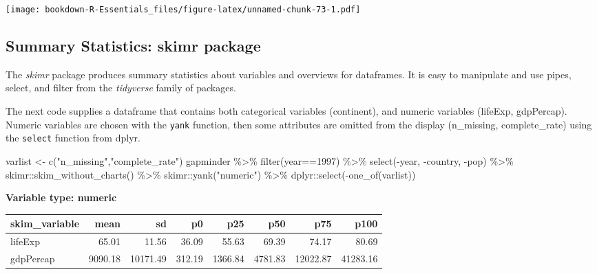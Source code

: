 \documentclass[
]{book}
\newenvironment{Shaded}{\begin{snugshade}}{\end{snugshade}}
\newcommand{\DecValTok}[1]{\textcolor[rgb]{0.00,0.00,0.81}{#1}}
\newcommand{\FunctionTok}[1]{\textcolor[rgb]{0.00,0.00,0.00}{#1}}
\newcommand{\NormalTok}[1]{#1}
\newcommand{\OtherTok}[1]{\textcolor[rgb]{0.56,0.35,0.01}{#1}}
\newcommand{\SpecialCharTok}[1]{\textcolor[rgb]{0.00,0.00,0.00}{#1}}
\newcommand{\StringTok}[1]{\textcolor[rgb]{0.31,0.60,0.02}{#1}}
\begin{document}
\texttt{[image: bookdown-R-Essentials\_files/figure-latex/unnamed-chunk-73-1.pdf]}

\hypertarget{summary-statistics-skimr-package}{%
\subsection{Summary Statistics: skimr package}\label{summary-statistics-skimr-package}}

The \emph{skimr} package produces summary statistics about variables and overviews for dataframes. It is easy to manipulate and use pipes, select, and filter from the \emph{tidyverse} family of packages.

The next code supplies a dataframe that contains both categorical variables (continent), and numeric variables (lifeExp, gdpPercap). Numeric variables are chosen with the \texttt{yank} function, then some attributes are omitted from the display (n\_missing, complete\_rate) using the \texttt{select} function from dplyr.

\begin{Shaded}
\begin{Highlighting}[]
\NormalTok{varlist }\OtherTok{\textless{}{-}} \FunctionTok{c}\NormalTok{(}\StringTok{"n\_missing"}\NormalTok{,}\StringTok{"complete\_rate"}\NormalTok{)}
\NormalTok{gapminder }\SpecialCharTok{\%\textgreater{}\%} 
  \FunctionTok{filter}\NormalTok{(year}\SpecialCharTok{==}\DecValTok{1997}\NormalTok{) }\SpecialCharTok{\%\textgreater{}\%} 
  \FunctionTok{select}\NormalTok{(}\SpecialCharTok{{-}}\NormalTok{year, }\SpecialCharTok{{-}}\NormalTok{country, }\SpecialCharTok{{-}}\NormalTok{pop) }\SpecialCharTok{\%\textgreater{}\%} 
\NormalTok{  skimr}\SpecialCharTok{::}\FunctionTok{skim\_without\_charts}\NormalTok{() }\SpecialCharTok{\%\textgreater{}\%}
\NormalTok{  skimr}\SpecialCharTok{::}\FunctionTok{yank}\NormalTok{(}\StringTok{"numeric"}\NormalTok{) }\SpecialCharTok{\%\textgreater{}\%}
\NormalTok{  dplyr}\SpecialCharTok{::}\FunctionTok{select}\NormalTok{(}\SpecialCharTok{{-}}\FunctionTok{one\_of}\NormalTok{(varlist))}
\end{Highlighting}
\end{Shaded}

\textbf{Variable type: numeric}

\begin{tabular}{l|r|r|r|r|r|r|r}
\hline
skim\_variable & mean & sd & p0 & p25 & p50 & p75 & p100\\
\hline
lifeExp & 65.01 & 11.56 & 36.09 & 55.63 & 69.39 & 74.17 & 80.69\\
\hline
gdpPercap & 9090.18 & 10171.49 & 312.19 & 1366.84 & 4781.83 & 12022.87 & 41283.16\\
\hline
\end{tabular}
\end{document}
